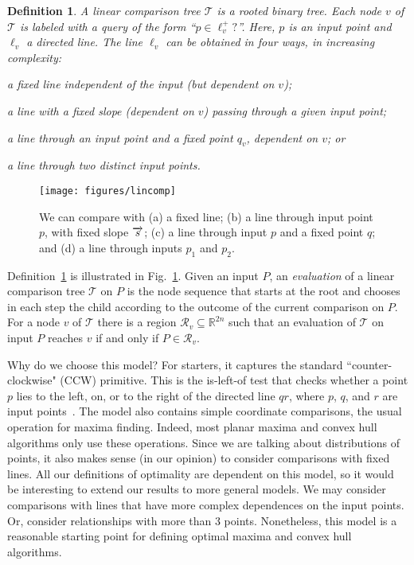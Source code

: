 \documentclass[letterpaper,11pt]{article}
\newtheorem{definition}[theorem]{Definition}
\newcommand{\R}{\mathbb{R}}
\newcommand{\cR}{\mathcal{R}}
\newcommand{\cT}{\mathcal{T}}
\begin{document}
\begin{definition}\label{def:opt} 
  A \emph{linear comparison tree} $\cT$ 
  is a rooted binary tree. Each 
  node $v$ of $\cT$ is labeled with 
  a query of the form ``$p \in \ell_v^+?$''. 
  Here, $p$ is an input point and 
  $\ell_v$ a directed line. The 
  line $\ell_v$ can be obtained 
  in four ways, in increasing complexity:
  \begin{asparaenum}
    \item\label{type:I} 
      a fixed line independent of 
      the input \textup(but dependent
      on $v$\textup);
     \item\label{type:II} 
       a line with a fixed slope 
       \textup(dependent on $v$\textup) 
       passing through a given input point;
     \item\label{type:III} 
       a line through an input point and 
       a fixed point $q_v$, dependent on $v$; or
     \item\label{type:IV} 
       a line through two distinct input points. 
  \end{asparaenum}
\end{definition}

\begin{figure}
  \centering
  \texttt{[image: figures/lincomp]}
  \caption{
    We can compare with (a) a fixed line;
    (b) a line through input point $p$, 
    with fixed slope $\protect\overrightarrow{s}$; 
    (c) a line through input $p$ and a 
    fixed point $q$; and (d) a line through 
    inputs $p_1$ and $p_2$.
  }
  \label{fig:lincomp}
\end{figure}

Definition~\ref{def:opt} is illustrated 
in Fig.~\ref{fig:lincomp}. 
Given an input $P$, an 
\emph{evaluation} of a linear 
comparison tree $\cT$ on $P$ 
is the node sequence 
that starts at the root 
and chooses in each step
the child according to the 
outcome of the current 
comparison on $P$. 
For a node $v$ of $\cT$
there is a region 
$\cR_v \subseteq \R^{2n}$ such 
that an evaluation of $\cT$ 
on input $P$ reaches $v$ if and only 
if $P \in \cR_v$. 

Why do we choose this model? 
For starters, it captures the standard ``counter-clockwise" (CCW) primitive. 
This is the is-left-of test that checks
whether a point $p$ lies to the left, 
on, or to the right of the directed line 
$qr$, where $p$, $q$, and $r$ are
input points~\cite{deBergChvKrOv08}.
The model also contains simple coordinate comparisons, the usual operation for maxima finding. Indeed, most planar maxima and convex hull algorithms only use these operations. Since we are talking about distributions of points, it also makes sense (in our opinion) to consider comparisons with fixed lines. All our definitions of optimality are dependent on this model,
so it would be interesting to extend our results to more general models. We may consider
comparisons with lines that have more complex dependences on the input points. Or, consider
relationships with more than 3 points. Nonetheless, this model is a reasonable starting point
for defining optimal maxima and convex hull algorithms.
\end{document}
